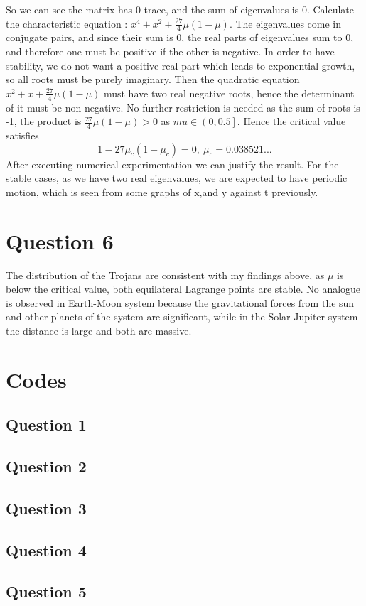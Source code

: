 \documentclass[11pt]{article}
\begin{document}
So we can see the matrix has 0 trace, and the sum of eigenvalues is 0. 
Calculate the characteristic equation : $x^4+x^2+\frac{27}{4}\mu(1-\mu)$.
The eigenvalues come in conjugate pairs, and since their sum is 0, the real parts of eigenvalues sum to 0, and therefore one must be positive if the other is negative. In order to have stability, we do not want a positive real part which leads to exponential growth, so all roots must be purely imaginary.
Then the quadratic equation $x^2+x+\frac{27}{4}\mu(1-\mu)$ must have two real negative roots, hence the determinant of it must be non-negative. No further restriction is needed as the sum of roots is -1, the product is $\frac{27}{4}\mu(1-\mu)>0$ as $mu \in \left(0,0.5\right]$.
Hence the critical value satisfies $$ 1-27\mu_{c} (1-\mu_{c}) = 0,\ \mu_{c} = 0.038521... $$
After executing numerical experimentation we can justify the result. For the stable cases, as we have two real eigenvalues, we are expected to have periodic motion, which is seen from some graphs of x,and y against t previously.
\section{Question 6}
The distribution of the Trojans are consistent with my findings above, as $\mu$ is below the critical value, both equilateral Lagrange points are stable. No analogue is observed in Earth-Moon system because the gravitational forces from the sun and other planets of the system are significant, while in the Solar-Jupiter system the distance is large and both are massive.
\newpage
\appendix
\section{Codes}
\subsection{Question 1}



\subsection{Question 2}



\subsection{Question 3}




\subsection{Question 4}




\subsection{Question 5}


\end{document}

